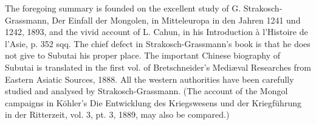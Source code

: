 The foregoing summary is founded on the excellent study of G. Strakosch-Grassmann, Der Einfall der Mongolen, in Mitteleuropa in den Jahren 1241 und 1242, 1893, and the vivid account of L. Cahun, in his Introduction à l\texthebrew{}’Histoire de l\texthebrew{}’Asie, p. 352 sqq. The chief defect in Strakosch-Grassmann\texthebrew{}’s book is that he does not give to Subutai his proper place. The important Chinese biography of Subutai is translated in the first vol. of Bretschneider\texthebrew{}’s Mediæval Researches from Eastern Asiatic Sources, 1888. All the western authorities have been carefully studied and analysed by Strakosch-Grassmann. (The account of the Mongol campaigns in Köhler\texthebrew{}’s Die Entwicklung des Kriegswesens und der Kriegführung in der Ritterzeit, vol. 3, pt. 3, 1889, may also be compared.)
